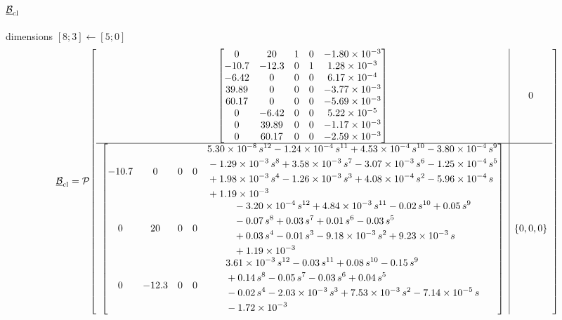 \documentclass{article}
\newcommand{\PIop}[6]{\mathcal P\!\left[\begin{array}{c|c}#1&#2\\\hline#3&\{#4,#5,#6\}\end{array}\right]}
\begin{document}
\paragraph{$\underline{\mathcal B}_{\rm cl}$}\hfill dimensions $[8;3]\leftarrow[5;0]$
\[\displaystyle \underline{\mathcal B}_{\rm cl}=\PIop{\begin{bmatrix}0 & 20 & 1 & 0 & -1.80\times10^{-3}\\-10.7 & -12.3 & 0 & 1 & 1.28\times10^{-3}\\-6.42 & 0 & 0 & 0 & 6.17\times10^{-4}\\39.89 & 0 & 0 & 0 & -3.77\times10^{-3}\\60.17 & 0 & 0 & 0 & -5.69\times10^{-3}\\0 & -6.42 & 0 & 0 & 5.22\times10^{-5}\\0 & 39.89 & 0 & 0 & -1.17\times10^{-3}\\0 & 60.17 & 0 & 0 & -2.59\times10^{-3}\end{bmatrix}}{0}{\begin{bmatrix}-10.7 & 0 & 0 & 0 & \begin{aligned}&5.30\times10^{-8}\,s^{12}-1.24\times10^{-4}\,s^{11}+4.53\times10^{-4}\,s^{10}-3.80\times10^{-4}\,s^{9}\\&-1.29\times10^{-3}\,s^{8}+3.58\times10^{-3}\,s^{7}-3.07\times10^{-3}\,s^{6}-1.25\times10^{-4}\,s^{5}\\&+1.98\times10^{-3}\,s^{4}-1.26\times10^{-3}\,s^{3}+4.08\times10^{-4}\,s^{2}-5.96\times10^{-4}\,s\\&+1.19\times10^{-3}\end{aligned}\\0 & 20 & 0 & 0 & \begin{aligned}&-3.20\times10^{-4}\,s^{12}+4.84\times10^{-3}\,s^{11}-0.02\,s^{10}+0.05\,s^{9}\\&-0.07\,s^{8}+0.03\,s^{7}+0.01\,s^{6}-0.03\,s^{5}\\&+0.03\,s^{4}-0.01\,s^{3}-9.18\times10^{-3}\,s^{2}+9.23\times10^{-3}\,s\\&+1.19\times10^{-3}\end{aligned}\\0 & -12.3 & 0 & 0 & \begin{aligned}&3.61\times10^{-3}\,s^{12}-0.03\,s^{11}+0.08\,s^{10}-0.15\,s^{9}\\&+0.14\,s^{8}-0.05\,s^{7}-0.03\,s^{6}+0.04\,s^{5}\\&-0.02\,s^{4}-2.03\times10^{-3}\,s^{3}+7.53\times10^{-3}\,s^{2}-7.14\times10^{-5}\,s\\&-1.72\times10^{-3}\end{aligned}\end{bmatrix}}{0}{0}{0}\]
\end{document}
